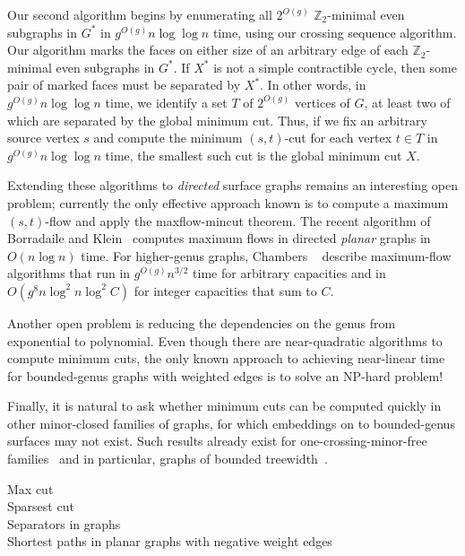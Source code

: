 \documentclass[natbib]{svcyclop}
\begin{document}
Our second algorithm begins by enumerating all $2^{O(g)}$ $\mathbb{Z}_2$-minimal even subgraphs in $G^*$ in $g^{O(g)}n\log\log n$ time, using our crossing sequence algorithm.
Our algorithm marks the faces on either size of an arbitrary edge of each $\mathbb{Z}_2$-minimal even subgraphs in $G^*$.  If $X^*$ is not a simple contractible cycle, then some pair of marked faces must be separated by $X^*$.  In other words, in $g^{O(g)}n\log\log n$ time, we identify a set $T$ of $2^{O(g)}$ vertices of $G$, at least two of which are separated by the global minimum cut.  Thus, if we fix an arbitrary source vertex $s$ and compute the minimum $(s,t)$-cut for each vertex $t\in T$ in $g^{O(g)}n\log\log n$ time, the smallest such cut is the global minimum cut $X$.



\OpenProb

Extending these algorithms to \emph{directed} surface graphs remains an interesting open problem; currently the only effective approach known is to compute a maximum $(s,t)$-flow and apply the maxflow-mincut theorem.  The recent algorithm of Borradaile and Klein~\cite{bk-amfdp-09} computes maximum flows in directed \emph{planar} graphs in $O(n\log n)$ time. For higher-genus graphs, Chambers \etal~\cite{cen-hfcc-12} describe maximum-flow algorithms that run in $g^{O(g)}n^{3/2}$ time for arbitrary capacities and in $O(g^8 n\log^2 n \log^2 C)$ for integer capacities that sum to $C$.

Another open problem is reducing the dependencies on the genus from exponential to polynomial.  Even though there are near-quadratic algorithms to compute minimum cuts, the only known approach to achieving near-linear time for bounded-genus graphs with weighted edges is to solve an NP-hard problem!

Finally, it is natural to ask whether minimum cuts can be computed quickly in other minor-closed families of graphs, for which embeddings on to bounded-genus surfaces may not exist.
Such results already exist for one-crossing-minor-free families~\cite{ce-fog-13} and in particular, graphs of bounded treewidth~\cite{hknr-cmfnc-98}.



\CrossRef

Max cut\\
Sparsest cut\\
Separators in graphs\\
Shortest paths in planar graphs with negative weight edges



\nocite{e-cocb-12}


%

\end{document}
